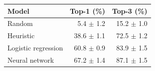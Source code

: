\begin{tabular}{lrr}
\hline
Model & Top-1 (\%) & Top-3 (\%) \\
\hline
Random & 5.4 $\pm$ 1.2 & 15.2 $\pm$ 1.0 \\
Heuristic & 38.6 $\pm$ 1.1 & 72.5 $\pm$ 1.2 \\
Logistic regression & 60.8 $\pm$ 0.9 & 83.9 $\pm$ 1.5 \\
Neural network & 67.2 $\pm$ 1.4 & 87.1 $\pm$ 1.5 \\
\hline
\end{tabular}